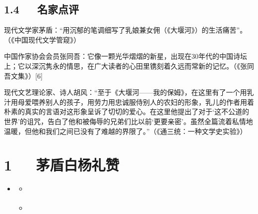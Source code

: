 \documentclass[letterpaper,12pt,english]{sphinxmanual}
\begin{document}
\section{1.4   名家点评}
\label{\detokenize{p01_u6563_u6587/_u827e_u9752-_u5927_u5830_u6cb3_u2014_u2014_u6211_u7684_u4fdd_u59c6:id6}}
现代文学家茅盾：“用沉郁的笔调细写了乳娘兼女佣（《大堰河》）的生活痛苦”。（《中国现代文学管窥》）

中国作家协会会员张同吾：它像一颗光华熠熠的新星，出现在30年代的中国诗坛上；它以深沉隽永的情思，在广大读者的心田里镌刻着久远而常新的记忆。（《张同吾文集》）{[}6{]}

现代文艺理论家、诗人胡风：“至于《大堰河——我的保姆》，在这里有了一个用乳汁用母爱喂养别人的孩子，用劳力用忠诚服侍别人的农妇的形象，乳儿的作者用着朴素的真实的言语对这形象呈诉了切切的爱心。在这里他提出了对于‘这不公道的世界’的诅咒，告白了他和被侮辱的兄弟们比以前‘更要亲密’。虽然全篇流着私情地温暖，但他和我们之间已没有了难越的界限了。”（《通三统：一种文学史实验》）


\chapter{1   茅盾\sphinxhyphen{}白杨礼赞}
\label{\detokenize{p01_u6563_u6587/_u8305_u76fe-_u767d_u6768_u793c_u8d5e:id1}}\label{\detokenize{p01_u6563_u6587/_u8305_u76fe-_u767d_u6768_u793c_u8d5e::doc}}
\begin{sphinxShadowBox}
\begin{itemize}
\item {} 
\label{\detokenize{p01_u6563_u6587/_u8305_u76fe-_u767d_u6768_u793c_u8d5e:id5}}{\hyperref[\detokenize{p01_u6563_u6587/_u8305_u76fe-_u767d_u6768_u793c_u8d5e:id1}]{}}
\begin{itemize}
\item {} 
\label{\detokenize{p01_u6563_u6587/_u8305_u76fe-_u767d_u6768_u793c_u8d5e:id6}}{\hyperref[\detokenize{p01_u6563_u6587/_u8305_u76fe-_u767d_u6768_u793c_u8d5e:id3}]{}}

\item {} 
\label{\detokenize{p01_u6563_u6587/_u8305_u76fe-_u767d_u6768_u793c_u8d5e:id7}}{\hyperref[\detokenize{p01_u6563_u6587/_u8305_u76fe-_u767d_u6768_u793c_u8d5e:id4}]{}}

\end{itemize}

\end{itemize}
\end{sphinxShadowBox}
\end{document}
